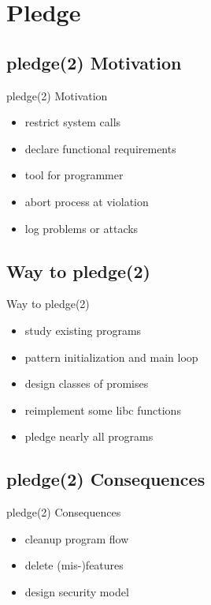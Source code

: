 \documentclass[14pt]{beamer}
\begin{document}
\section{Pledge}

\subsection{pledge(2) Motivation}
\begin{frame}{pledge(2) Motivation}
\begin{itemize}
    \item restrict system calls
    \item declare functional requirements
    \item tool for programmer
    \item abort process at violation
    \item log problems or attacks
\end{itemize}
\end{frame}

\subsection{Way to pledge(2)}
\begin{frame}{Way to pledge(2)}
\begin{itemize}
    \item study existing programs
    \item pattern initialization and main loop
    \item design classes of promises
    \item reimplement some libc functions
    \item pledge nearly all programs
\end{itemize}
\end{frame}

\subsection{pledge(2) Consequences}
\begin{frame}{pledge(2) Consequences}
\begin{itemize}
    \item cleanup program flow
    \item delete (mis-)features
    \item design security model
\end{itemize}
\end{frame}
\end{document}
